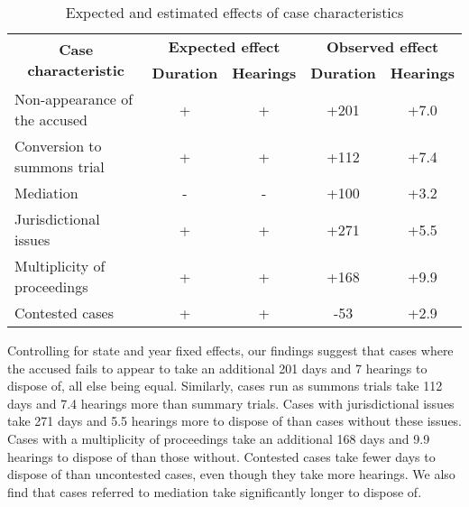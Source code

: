 \documentclass[12pt,a4paper]{article}
\begin{document}
	\begin{table}[!ht]
		\caption{Expected and estimated effects of case characteristics}
		\label{tab:observed}
		\centering
		\footnotesize
		\begin{tabular}{lcc|cc}
			\toprule
			\multicolumn{1}{c}{\multirow{2}{*}{\textbf{Case characteristic}}} & \multicolumn{2}{c}{\textbf{Expected effect}} & \multicolumn{2}{c}{\textbf{Observed effect}} \\ \cmidrule(l){2-5}
			\multicolumn{1}{c}{} & \textbf{Duration} & \textbf{Hearings} & \textbf{Duration} & \textbf{Hearings}\\ \midrule
			Non-appearance of the accused & + & + & +201 & +7.0 \\
			Conversion to summons trial & + & + & +112 & +7.4\\
			Mediation & - & - & +100 & +3.2 \\
			Jurisdictional issues & + & + & +271 & +5.5 \\
			Multiplicity of proceedings & + & + & +168 & +9.9\\
			Contested cases & + & + & -53 & +2.9\\ \bottomrule
		\end{tabular}
	\end{table}
	
	
	Controlling for state and year fixed effects, our findings suggest that cases where the accused fails to appear to take an additional 201 days and 7 hearings to dispose of, all else being equal. Similarly, cases run as summons trials take 112 days and 7.4 hearings more than summary trials. Cases with jurisdictional issues take 271 days and 5.5 hearings more to dispose of than cases without these issues. Cases with a multiplicity of proceedings take an additional 168 days and 9.9 hearings to dispose of than those without. Contested cases take fewer days to dispose of than uncontested cases, even though they take more hearings. We also find that cases referred to mediation take significantly longer to dispose of.
	
\end{document}
